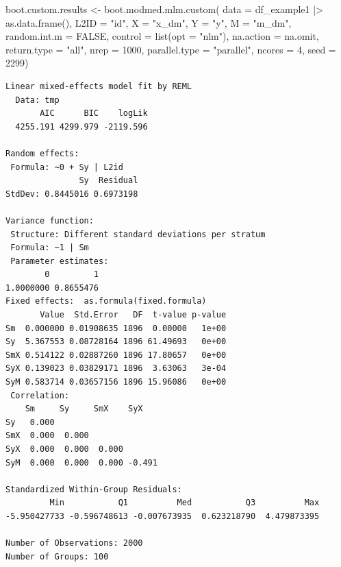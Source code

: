 \documentclass[
  letterpaper,
  DIV=11,
  numbers=noendperiod]{scrreprt}
\newenvironment{Shaded}{\begin{snugshade}}{\end{snugshade}}
\newcommand{\AttributeTok}[1]{\textcolor[rgb]{0.40,0.45,0.13}{#1}}
\newcommand{\ConstantTok}[1]{\textcolor[rgb]{0.56,0.35,0.01}{#1}}
\newcommand{\DecValTok}[1]{\textcolor[rgb]{0.68,0.00,0.00}{#1}}
\newcommand{\FunctionTok}[1]{\textcolor[rgb]{0.28,0.35,0.67}{#1}}
\newcommand{\NormalTok}[1]{\textcolor[rgb]{0.00,0.23,0.31}{#1}}
\newcommand{\OtherTok}[1]{\textcolor[rgb]{0.00,0.23,0.31}{#1}}
\newcommand{\SpecialCharTok}[1]{\textcolor[rgb]{0.37,0.37,0.37}{#1}}
\newcommand{\StringTok}[1]{\textcolor[rgb]{0.13,0.47,0.30}{#1}}
\begin{document}
\begin{Shaded}
\begin{Highlighting}[]
\NormalTok{boot.custom.results }\OtherTok{\textless{}{-}} \FunctionTok{boot.modmed.mlm.custom}\NormalTok{(}
  \AttributeTok{data =}\NormalTok{ df\_example1 }\SpecialCharTok{|\textgreater{}} \FunctionTok{as.data.frame}\NormalTok{(),}
  \AttributeTok{L2ID =} \StringTok{"id"}\NormalTok{,}
  \AttributeTok{X =} \StringTok{"x\_dm"}\NormalTok{,}
  \AttributeTok{Y =} \StringTok{"y"}\NormalTok{,}
  \AttributeTok{M =} \StringTok{"m\_dm"}\NormalTok{,}
  \AttributeTok{random.int.m =} \ConstantTok{FALSE}\NormalTok{,}
  \AttributeTok{control =} \FunctionTok{list}\NormalTok{(}\AttributeTok{opt =} \StringTok{"nlm"}\NormalTok{),}
  \AttributeTok{na.action =}\NormalTok{ na.omit,}
  \AttributeTok{return.type =} \StringTok{"all"}\NormalTok{,}
  \AttributeTok{nrep =} \DecValTok{1000}\NormalTok{,}
  \AttributeTok{parallel.type =} \StringTok{"parallel"}\NormalTok{,}
  \AttributeTok{ncores =} \DecValTok{4}\NormalTok{,}
  \AttributeTok{seed =} \DecValTok{2299}\NormalTok{)}
\end{Highlighting}
\end{Shaded}

\begin{Shaded}
\end{Shaded}

\begin{verbatim}
Linear mixed-effects model fit by REML
  Data: tmp 
       AIC      BIC    logLik
  4255.191 4299.979 -2119.596

Random effects:
 Formula: ~0 + Sy | L2id
               Sy  Residual
StdDev: 0.8445016 0.6973198

Variance function:
 Structure: Different standard deviations per stratum
 Formula: ~1 | Sm 
 Parameter estimates:
        0         1 
1.0000000 0.8655476 
Fixed effects:  as.formula(fixed.formula) 
       Value  Std.Error   DF  t-value p-value
Sm  0.000000 0.01908635 1896  0.00000   1e+00
Sy  5.367553 0.08728164 1896 61.49693   0e+00
SmX 0.514122 0.02887260 1896 17.80657   0e+00
SyX 0.139023 0.03829171 1896  3.63063   3e-04
SyM 0.583714 0.03657156 1896 15.96086   0e+00
 Correlation: 
    Sm     Sy     SmX    SyX   
Sy   0.000                     
SmX  0.000  0.000              
SyX  0.000  0.000  0.000       
SyM  0.000  0.000  0.000 -0.491

Standardized Within-Group Residuals:
         Min           Q1          Med           Q3          Max 
-5.950427733 -0.596748613 -0.007673935  0.623218790  4.479873395 

Number of Observations: 2000
Number of Groups: 100 
\end{verbatim}
\end{document}
